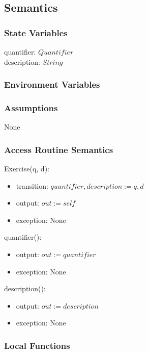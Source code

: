 \documentclass[12pt, titlepage]{article}
\begin{document}
\subsection{Semantics}

\subsubsection{State Variables}

quantifier: $Quantifier$ \\
description: $String$

\subsubsection{Environment Variables}

\subsubsection{Assumptions}

None

\subsubsection{Access Routine Semantics}

\noindent Exercise(q, d):
\begin{itemize}
	\item transition: $quantifier, description := q, d$
	\item output: $out := self$
	\item exception: None
\end{itemize}

\noindent quantifier():
\begin{itemize}
	\item output: $out := quantifier$
	\item exception: None
\end{itemize}

\noindent description():
\begin{itemize}
	\item output: $out := description$
	\item exception: None
\end{itemize}

\subsubsection{Local Functions}
\end{document}
